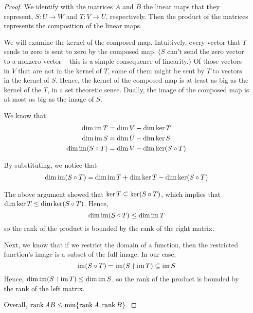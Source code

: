 \documentclass[11pt,letterpaper]{article}
\begin{document}
\begin{proof}
    We identify with the matrices $A$ and $B$ the linear maps that they
    represent, $S : U \to W$ and $T : V \to U$, respectively. Then the product
    of the matrices represents the composition of the linear maps.

    We will examine the kernel of the composed map. Intuitively, every vector
    that $T$ sends to zero is sent to zero by the composed map.
    ($S$ can't send the zero vector to a nonzero vector -- this is a simple
    consequence of linearity.)
    Of those vectors in $V$ that are not in the kernel of $T$, some of them
    might be sent by $T$ to vectors in the kernel of $S$.
    Hence, the kernel of the composed map is at least as big as the kernel of
    the $T$, in a set theoretic sense. Dually, the image of the composed map
    is at most as big as the image of $S$.

    We know that
    \begin{align*}
        \operatorname{dim} \operatorname{im} T &= \operatorname{dim} V - \operatorname{dim} \operatorname{ker} T \\
        \operatorname{dim} \operatorname{im} S &= \operatorname{dim} U - \operatorname{dim} \operatorname{ker} S \\
        \operatorname{dim} \operatorname{im} (S \circ T) &= \operatorname{dim} V - \operatorname{dim} \operatorname{ker} (S \circ T)
    \end{align*}

    By substituting, we notice that
    \begin{align*}
        \operatorname{dim} \operatorname{im} (S \circ T)
        =
        \dim \operatorname{im} T + \dim \ker T - \dim \ker (S \circ T)
    \end{align*}

    The above argument showed that $\ker T \subseteq \ker (S \circ T)$,
    which implies that $\operatorname{dim} \ker T \leq \operatorname{dim} \ker (S \circ T)$.
    Hence,
    \begin{equation*}
        \operatorname{dim} \operatorname{im} (S \circ T) \leq \dim \operatorname{im} T
    \end{equation*}
    so the rank of the product is bounded by the rank of the right matrix.

    Next, we know that if we restrict the domain of a function, then the
    restricted function's image is a subset of the full image. In our case,
    \begin{equation*}
        \operatorname{im} (S \circ T) = \operatorname{im} (S \upharpoonright \operatorname{im} T) \subseteq \operatorname{im} S
    \end{equation*}
    Hence, $\operatorname{dim} \operatorname{im} (S \upharpoonright \operatorname{im} T) \leq \operatorname{dim} \operatorname{im} S$,
    so the rank of the product is bounded by the rank of the left matrix.

    Overall, $\operatorname{rank}{AB} \leq \min\{\operatorname{rank} A, \operatorname{rank} B\}$.
\end{proof}
\end{document}
